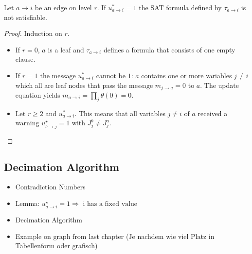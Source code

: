 \begin{lemma}\cite{survprob} Let $a \rightarrow i$ be an edge on level $r$. \newline
If $u^{\ast}_{a \rightarrow i} = 1$ the SAT formula defined by $\tau_{a \rightarrow i}$ is not satisfiable.

\begin{proof} Induction on $r$.
\begin{itemize}
	\item If $r = 0$, $a$ is a leaf and $\tau_{a \rightarrow i}$ defines a formula that consists of one empty clause.
	\item If $r = 1$ the message $u^{\ast}_{a \rightarrow i}$ cannot be $1$: $a$ contains one or more variables $j \neq i$ which all are leaf nodes that pass the message $m_{j \rightarrow a} = 0$ to $a$. The update equation yields $m_{a \rightarrow i} = \prod_j \theta(0) = 0$.
	\item Let $r \geq 2$ and $u^{\ast}_{a \rightarrow i}$. This means that all variables $j \neq i$ of $a$ received a warning $u^\star_{b \rightarrow j} = 1$ with $J_j^b \neq J_j^a$. 
\end{itemize}
\end{proof}

\end{lemma}

\subsection{Decimation Algorithm}

\begin{itemize}
\item Contradiction Numbers
\item Lemma: $u^{\star}_{a \rightarrow i} = 1 \Rightarrow \text{ i has a fixed value}$
\item Decimation Algorithm
\item Example on graph from last chapter
	  (Je nachdem wie viel Platz in Tabellenform oder grafisch)


\end{itemize} 

